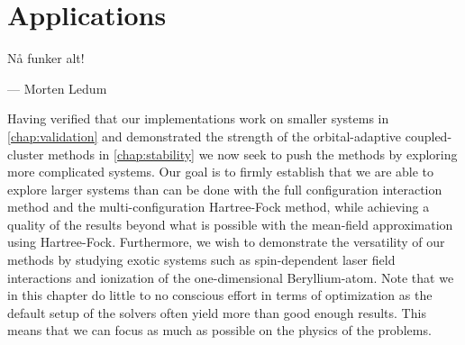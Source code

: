 \chapter{Applications}
    \epigraph{Nå funker alt!}
    {--- Morten Ledum}

    Having verified that our implementations work on smaller systems in
    \autoref{chap:validation} and demonstrated the strength of the
    orbital-adaptive coupled-cluster methods in \autoref{chap:stability} we now
    seek to push the methods by exploring more complicated systems.
    Our goal is to firmly establish that we are able to explore larger systems
    than can be done with the full configuration interaction method and the
    multi-configuration Hartree-Fock method, while achieving a quality of the
    results beyond what is possible with the mean-field approximation using
    Hartree-Fock.
    Furthermore, we wish to demonstrate the versatility of our methods by
    studying exotic systems such as spin-dependent laser field interactions and
    ionization of the one-dimensional Beryllium-atom.
    Note that we in this chapter do little to no conscious effort in terms of
    optimization as the default setup of the solvers often yield more than good
    enough results.
    This means that we can focus as much as possible on the physics of the
    problems.

